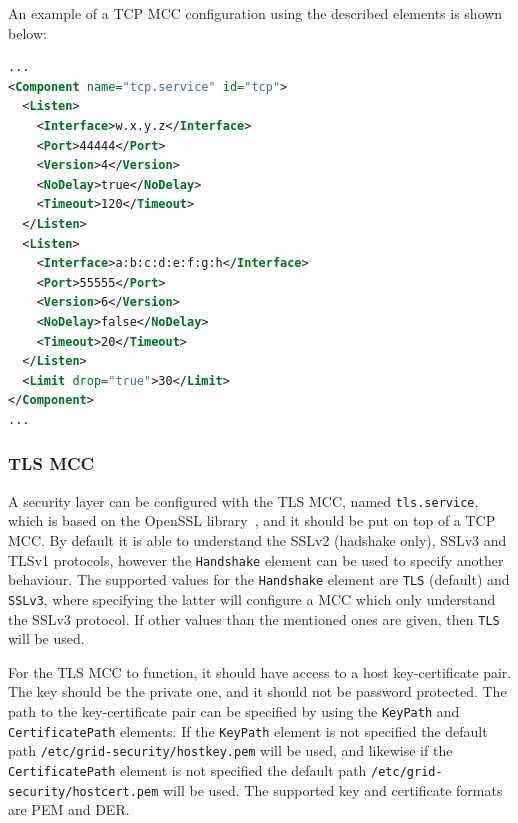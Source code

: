 \documentclass{article}
\begin{document}
An example of a TCP MCC configuration using the described elements is shown
below:
\begin{lstlisting}[language=xml]
...
<Component name="tcp.service" id="tcp">
  <Listen>
    <Interface>w.x.y.z</Interface>
    <Port>44444</Port>
    <Version>4</Version>
    <NoDelay>true</NoDelay>
    <Timeout>120</Timeout>
  </Listen>
  <Listen>
    <Interface>a:b:c:d:e:f:g:h</Interface>
    <Port>55555</Port>
    <Version>6</Version>
    <NoDelay>false</NoDelay>
    <Timeout>20</Timeout>
  </Listen>
  <Limit drop="true">30</Limit>
</Component>
...
\end{lstlisting}

\subsubsection{TLS MCC}\label{sec:tls-mcc}
A security layer can be configured with the TLS MCC, named \texttt{tls.service},
which is based on the OpenSSL library~\cite{openssl}, and it should be put on
top of a TCP MCC. By default it is able to understand
the SSLv2 (hadshake only), SSLv3 and TLSv1 protocols, however the \texttt{Handshake}
element can be used to specify another behaviour. The supported values for the
\texttt{Handshake} element are \texttt{TLS} (default) and \texttt{SSLv3}, where
specifying the latter will configure a MCC which only understand the SSLv3
protocol. If other values than the mentioned ones are given, then \texttt{TLS}
will be used.

For the TLS MCC to function, it should have access to a host key-certificate
pair. The key should be the private one, and it should not be password
protected. The path to the key-certificate pair can be specified by using the
\texttt{KeyPath} and \texttt{CertificatePath} elements. If the \texttt{KeyPath}
element is not specified the default path
\texttt{/etc/grid-security/hostkey.pem} will be used, and likewise if the
\texttt{CertificatePath} element is not specified the default path
\texttt{/etc/grid-security/hostcert.pem} will be used. The supported key and
certificate formats are PEM and DER.
\end{document}

